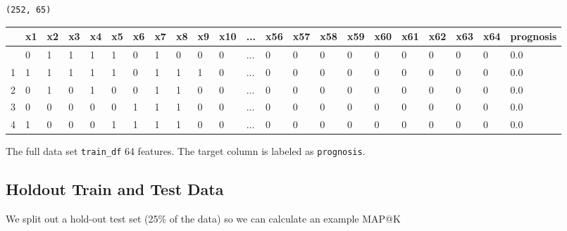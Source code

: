 \documentclass[
  letterpaper,
  DIV=11,
  numbers=noendperiod]{scrreprt}
\begin{document}
\begin{verbatim}
(252, 65)
\end{verbatim}

\begin{longtable}[]{@{}llllllllllllllllllllll@{}}
\toprule\noalign{}
& x1 & x2 & x3 & x4 & x5 & x6 & x7 & x8 & x9 & x10 & ... & x56 & x57 &
x58 & x59 & x60 & x61 & x62 & x63 & x64 & prognosis \\
\midrule\noalign{}
\endhead
\bottomrule\noalign{}
\endlastfoot
0 & 0 & 1 & 1 & 1 & 1 & 0 & 1 & 0 & 0 & 0 & ... & 0 & 0 & 0 & 0 & 0 & 0
& 0 & 0 & 0 & 0.0 \\
1 & 1 & 1 & 1 & 1 & 1 & 0 & 1 & 1 & 1 & 0 & ... & 0 & 0 & 0 & 0 & 0 & 0
& 0 & 0 & 0 & 0.0 \\
2 & 0 & 1 & 0 & 1 & 0 & 0 & 1 & 1 & 0 & 0 & ... & 0 & 0 & 0 & 0 & 0 & 0
& 0 & 0 & 0 & 0.0 \\
3 & 0 & 0 & 0 & 0 & 0 & 1 & 1 & 1 & 0 & 0 & ... & 0 & 0 & 0 & 0 & 0 & 0
& 0 & 0 & 0 & 0.0 \\
4 & 1 & 0 & 0 & 0 & 1 & 1 & 1 & 1 & 0 & 0 & ... & 0 & 0 & 0 & 0 & 0 & 0
& 0 & 0 & 0 & 0.0 \\
\end{longtable}

The full data set \texttt{train\_df} 64 features. The target column is
labeled as \texttt{prognosis}.

\hypertarget{holdout-train-and-test-data}{%
\subsection{Holdout Train and Test
Data}\label{holdout-train-and-test-data}}

We split out a hold-out test set (25\% of the data) so we can calculate
an example MAP@K
\end{document}
